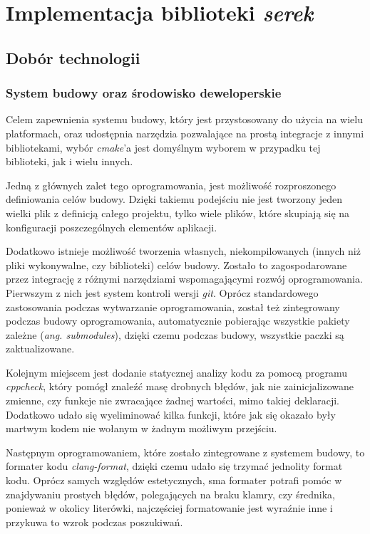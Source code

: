 \documentclass[12pt]{article}
\newcommand{\n}{\newline}
\begin{document}
	{
		\section{Implementacja biblioteki {\it serek}}\label{serek}

		{
			\subsection{Dobór technologii}

			{
				\subsubsection{System budowy oraz środowisko deweloperskie}

				Celem zapewnienia systemu budowy, który jest przystosowany do użycia na wielu platformach, oraz udostępnia narzędzia pozwalające na prostą
				integracje z innymi bibliotekami, wybór {\it cmake}'a\cite{cmake_docs} jest domyślnym wyborem w przypadku tej biblioteki, jak i wielu innych.\n

				Jedną z głównych zalet tego oprogramowania, jest możliwość rozproszonego definiowania celów budowy. Dzięki takiemu podejściu nie jest tworzony
				jeden wielki plik z definicją całego projektu, tylko wiele plików, które skupiają się na konfiguracji poszczególnych elementów aplikacji.\n

				Dodatkowo istnieje możliwość tworzenia własnych, niekompilowanych (innych niż pliki wykonywalne, czy biblioteki) celów budowy. Zostało to zagospodarowane
				przez integrację z różnymi narzędziami wspomagającymi rozwój oprogramowania. Pierwszym z nich jest system kontroli wersji {\it git}\cite{git_docs}. Oprócz standardowego
				zastosowania podczas wytwarzanie oprogramowania, został też zintegrowany podczas budowy oprogramowania, automatycznie pobierając wszystkie pakiety zależne
				({\it ang. submodules}), dzięki czemu podczas budowy, wszystkie paczki są zaktualizowane.\n

				Kolejnym miejscem jest dodanie statycznej analizy kodu za pomocą programu {\it cppcheck}\cite{cppcheck_repo}, który pomógł znaleźć masę drobnych błędów,
				jak nie zainicjalizowane zmienne, czy funkcje nie zwracające żadnej wartości, mimo takiej deklaracji. Dodatkowo udało się wyeliminować kilka funkcji,
				które jak się okazało były martwym kodem nie wołanym w żadnym możliwym przejściu.\n

				Następnym oprogramowaniem, które zostało zintegrowane z systemem budowy, to formater kodu {\it clang-format}\cite{clangformat_docs}, dzięki czemu
				udało się trzymać jednolity format kodu. Oprócz samych względów estetycznych, sma formater potrafi pomóc w znajdywaniu prostych błędów, polegających
				na braku klamry, czy średnika, ponieważ w okolicy literówki, najczęściej formatowanie jest wyraźnie inne i przykuwa to wzrok podczas poszukiwań.\n

}}}
\end{document}
